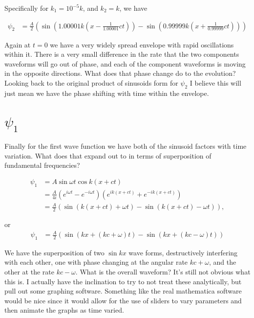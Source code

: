 Specifically for $k_1 = 10^{-5} k$, and $k_2 = k$, we have

\begin{align*}
\psi_2
&= \frac{A}{2} \left( 
\sin \left( 1.00001 k \left(x - \frac{1}{1.00001} c t\right) \right)
-\sin \left( 0.99999 k \left(x + \frac{1}{0.99999 } c t\right) \right)
\right)
\end{align*}

Again at $t=0$ we have a very widely spread envelope with rapid oscillations within it.  There is a very small difference in the rate that the two components waveforms will go out of phase, and each of the component waveforms is moving in the opposite directions.  What does that phase change do to the evolution?  Looking back to the original product of sinusoids form for $\psi_2$ I believe this will just mean we have the phase shifting with time within the envelope.

\section{$\psi_1$}

Finally for the first wave function we have both of the sinusoid factors with time variation.  What does that expand out to in terms of superposition of fundamental frequencies?

\begin{align*}
\psi_1
&= A \sin \omega t \cos k ( x + c t) \\
&= \frac{A}{4i} \left( e^{ i \omega t} - e^{ -i \omega t } \right) \left( e^{ i k ( x + c t)} + e^{ -i k ( x + c t)} \right) \\
&= \frac{A}{2} \left( 
\sin ( k (x + c t) + \omega t )
-\sin ( k (x + c t) - \omega t )
\right),
\end{align*}

or
\begin{align*}
\psi_1
&= \frac{A}{2} \left( 
\sin ( k x + ( k c + \omega ) t )
-\sin ( k x + ( k c - \omega) t )
\right)
\end{align*}

We have the superposition of two $\sin k x$ wave forms, destructively interfering with each other, one with phase changing at the angular rate $k c + \omega$, and the other at the rate $k c - \omega$.  What is the overall waveform?  It's still not obvious what this is.  I actually have the inclination to try to not treat these analytically, but pull out some graphing software.  Something like the real mathematica software would be nice since it would allow for the use of sliders to vary parameters and then animate the graphs as time varied.

\EndArticle
